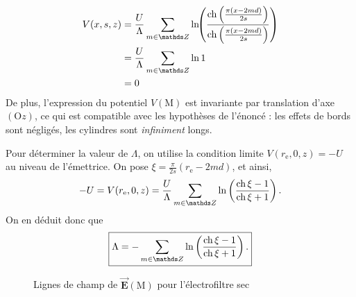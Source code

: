 \documentclass[a4paper, 10pt]{article}
\makeatletter
\let\@vec\vec
\renewcommand{\vec}[1]{\ensuremath{\@vec{\mathbf{#1}}}}
\makeatother
\begin{document}
\begin{multicols}{2}
\begin{enumerate}
\begin{enumerate}
\begin{align*}
							V(x, s, z) &= \frac{U}{\Lambda} \sum_{m \in \Z} \ln\!\!\left( \frac{\ch\left( \frac{\pi(x-2md)}{2s} \right)}{\ch\left( \frac{\pi(x-2md)}{2s} \right)} \right)\\
							&= \frac{U}{\Lambda} \sum_{m \in \Z} \ln 1 \\
							&= 0 \\
						\end{align*}
						De plus, l'expression du potentiel $V(\mathrm{M})$\/ est invariante par translation d'axe $(\mathrm{O}z)$, ce qui est compatible avec les hypothèses de l'énoncé : les effets de bords sont négligés, les cylindres sont \textit{infiniment} longs.

						Pour déterminer la valeur de $\Lambda$, on utilise la condition limite $V(r_\mathrm{e}, 0, z) = -U$\/ au niveau de l'émettrice. On pose $\xi = \frac{\pi}{2s}(r_\mathrm{e} - 2md)$, et ainsi, \[
							-U = V(r_\mathrm{e}, 0, z) = \frac{U}{\Lambda} \sum_{m \in \Z} \ln\left( \frac{\ch \xi - 1}{\ch \xi + 1} \right).
						\] On en déduit donc que \[
							\boxed{\Lambda = - \sum_{m \in \Z} \ln\left( \frac{\ch \xi - 1}{\ch \xi + 1} \right).}
						\]
				\end{enumerate}
		\end{enumerate}
	\end{multicols}
	\begin{figure}[H]
		\centering
		\caption{Lignes de champ de $\vec{E}(\mathrm{M})$\/ pour l'électrofiltre sec}
		\label{fig:lignes-champ}
	\end{figure}
\end{document}
